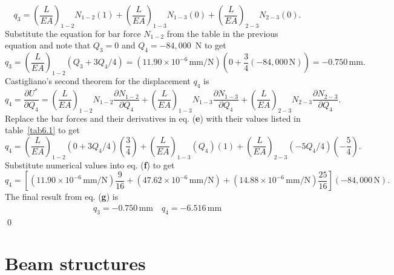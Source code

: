 \documentclass{AeroStructure-ERJohnson}
\begin{document}
\begin{example*}
\vspace*{-1pc}

\begin{equation*}
q_{3}=\left(\frac{L}{E A}\right)_{1-2} N_{1-2}(1)+\left(\frac{L}{E A}\right)_{1-3} N_{1-3}(0)+\left(\frac{L}{E A}\right)_{2-3} N_{2-3}(0).\tag{c}
\end{equation*}
Substitute the equation for bar force $N_{1-2}$ from the table in the previous equation and note that $Q_{3}=0$ and $Q_{4}=-84{,}000$~N to get
\begin{equation*}
q_{3}=\left(\frac{L}{E A}\right)_{1-2}\left(Q_{3}+3 Q_{4}/4\right)=\left(11.90\times 10^{-6}\,\mathrm{mm}/ \mathrm{N}\right)\left(0+\frac{3}{4}(-84{,}000\,\mathrm{N})\right)=-0.750\,\mathrm{mm}.\tag{d}
\end{equation*}
Castigliano's second theorem for the displacement $q_4$ is
\begin{equation*}
q_{4}=\frac{\partial U^{*}}{\partial Q_{4}}=\left(\frac{L}{E A}\right)_{1-2} N_{1-2} \frac{\partial N_{1-2}}{\partial Q_{4}}+\left(\frac{L}{E A}\right)_{1-3} N_{1-3} \frac{\partial N_{1-3}}{\partial Q_{4}}+\left(\frac{L}{E A}\right)_{2-3} N_{2-3} \frac{\partial N_{2-3}}{\partial Q_{4}}.\tag{e}
\end{equation*}
Replace the bar forces and their derivatives in eq. (\textbf{e}) with their values listed in table~\ref{tab6.1} to get
\begin{equation*}
q_{4}=\left(\frac{L}{E A}\right)_{1-2}\left(0+3 Q_{4}/4\right)\left(\frac{3}{4}\right)+\left(\frac{L}{E A}\right)_{1-3}\left(Q_{4}\right)(1)+\left(\frac{L}{E A}\right)_{2-3}\left(-5 Q_{4}/4\right)\left(-\frac{5}{4}\right).\tag{f}
\end{equation*}
Substitute numerical values into eq. (\textbf{f}) to get
\begin{equation*}
q_{4}=\left[(11.90 \times 10^{-6}\,\mathrm{mm} / \mathrm{N}) \frac{9}{16}+(47.62 \times 10^{-6}\,\mathrm{mm} / \mathrm{N})+(14.88 \times 10^{-6}\,\mathrm{mm} / \mathrm{N}) \frac{25}{16}\right](-84{,}000\,\mathrm{N}).\tag{g}
\end{equation*}
The final result from eq. (\textbf{g}) is
\begin{align*}
q_{3}=-0.750\,\mathrm{mm} \quad q_{4}=-6.516\,\mathrm{mm}  \tag{h}
\end{align*}\hfill\qed
\end{example*}

\section{Beam structures}\label{sec6.2}
\end{document}
